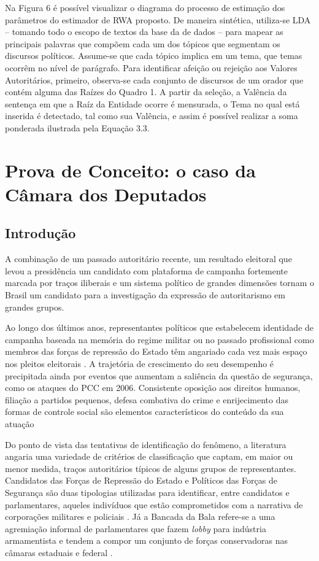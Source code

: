 \documentclass[
12pt,				%
openright,			%
twoside,			%
a4paper,			%
english,			%
french,				%
spanish,			%
brazil				%
]{abntex2}
\begin{document}
Na Figura 6 é possível visualizar o diagrama do processo de estimação dos parâmetros do estimador de RWA proposto. De maneira sintética, utiliza-se LDA  -- tomando todo o escopo de textos da base da de dados -- para mapear as principais palavras que compõem cada um dos tópicos que segmentam os discursos políticos. Assume-se que cada tópico implica em um tema, que temas ocorrêm no nível de parágrafo. Para identificar afeição ou rejeição aos Valores Autoritários, primeiro, observa-se cada conjunto de discursos de um orador que contém alguma das Raízes do Quadro 1. A partir da seleção, a Valência da sentença em que a Raíz da Entidade ocorre é mensurada, o Tema no qual está inserida é detectado, tal como sua Valência, e assim é possível realizar a soma ponderada ilustrada pela Equação 3.3.

\chapter{Prova de Conceito: o caso da Câmara dos Deputados}\label{resultados}

\section{Introdução}

A combinação de um passado autoritário recente, um resultado eleitoral que levou a presidência um candidato com plataforma de campanha fortemente marcada por traços iliberais \cite{hunter2019bolsonaro} e um sistema político de grandes dimensões tornam o Brasil um candidato para a investigação da expressão de autoritarismo em grandes grupos.

Ao longo dos últimos anos, representantes políticos que estabelecem identidade de campanha baseada na memória do regime militar ou no passado profissional como membros das forças de repressão do Estado têm angariado cada vez mais espaço nos pleitos eleitorais \cite{berlatto2015candidatos, berlatto2016policia}. A trajetória de crescimento do seu desempenho é precipitada ainda por eventos que aumentam a saliência da questão de segurança, como os ataques do PCC em 2006. Consistente oposição aos direitos humanos, filiação a partidos pequenos, defesa combativa do crime e enrijecimento das formas de controle social são elementos característicos do conteúdo da sua atuação \cite{berlatto2015candidatos, berlatto2016policia, faganellobancada, faganello2017voto}

Do ponto de vista das tentativas de identificação do fenômeno, a literatura angaria uma variedade de critérios de classificação que captam, em maior ou menor medida, traços autoritários típicos de alguns grupos de representantes. Candidatos das Forças de Repressão do Estado e Políticos das Forças de Segurança são duas tipologias utilizadas para identificar, entre candidatos e parlamentares, aqueles indivíduos que estão comprometidos com a narrativa de corporações militares e policiais \cite{berlatto2015candidatos,berlatto2016policia}. Já a Bancada da Bala refere-se a uma agremiação informal de parlamentares que fazem \textit{lobby} para indústria armamentista e tendem a compor um conjunto de forças conservadoras nas câmaras estaduais e federal \cite{faganellobancada,faganello2017voto}.
\end{document}
